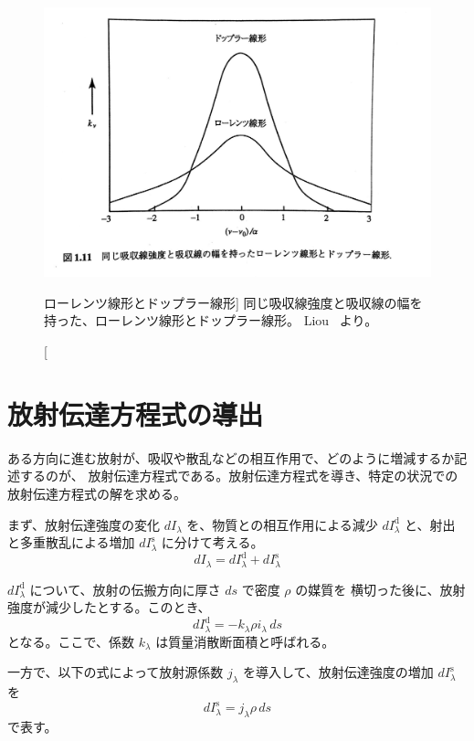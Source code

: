 \documentclass[article]{dennou777}
\begin{document}
\begin{figure}[t]
	\includegraphics[width=\textwidth]{lorentz.jpg}
	\caption
		[ローレンツ線形とドップラー線形]
		{
			同じ吸収線強度と吸収線の幅を持った、ローレンツ線形とドップラー線形。
			Liou~\cite{liou} より。
		}
\end{figure}


\section{放射伝達方程式の導出}
ある方向に進む放射が、吸収や散乱などの相互作用で、どのように増減するか記述するのが、
放射伝達方程式である。放射伝達方程式を導き、特定の状況での放射伝達方程式の解を求める。

まず、放射伝達強度の変化 $dI_\lambda$ を、物質との相互作用による減少
$dI_\lambda^\mathrm{d}$ と、射出と多重散乱による増加 $dI_\lambda^\mathrm{s}$ に分けて考える。
\begin{equation}
	dI_\lambda=dI_\lambda^\mathrm{d}+dI_\lambda^\mathrm{s}
\end{equation}

$dI_\lambda^\mathrm{d}$ について、放射の伝搬方向に厚さ $ds$ で密度 $\rho$ の媒質を
横切った後に、放射強度が減少したとする。このとき、
\begin{equation}
	dI_\lambda^\mathrm{d}=-k_\lambda\rho i_\lambda\,ds
\end{equation}
となる。ここで、係数 $k_\lambda$ は質量消散断面積と呼ばれる。

一方で、以下の式によって放射源係数 $j_\lambda$ を導入して、放射伝達強度の増加
$dI_\lambda^\mathrm{s}$ を
\begin{equation}
	dI_\lambda^\mathrm{s}=j_\lambda\rho\,ds
\end{equation}
で表す。
\end{document}
